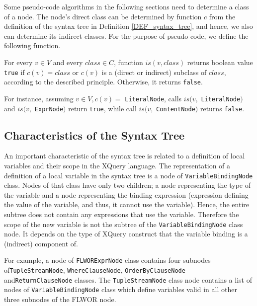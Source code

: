 Some pseudo-code algorithms in the following sections need to determine a class of a node. The node's direct class can be determined by function $c$ from the definition of the syntax tree in Definition \ref{DEF_syntax_tree}, and hence, we also can determine its indirect classes. For the purpose of pseudo code, we define the following function.

\begin{define}For every $v \in V$ and every $class \in C$, function $is(v, class)$ returns boolean value \texttt{true} if $c(v) = class$ or $c(v)$ is a (direct or indirect) subclass of $class$, according to the described principle. Otherwise, it returns \texttt{false}.
\end{define}

For instance, assuming $v \in V, c(v) =$ \texttt{LiteralNode}, calls $is(v,$ \texttt{LiteralNode}$)$ and $is(v,$ \texttt{ExprNode}$)$ return \texttt{true}, while call $is(v,$ \texttt{ContentNode}$)$ returns \texttt{false}.

\subsection{Characteristics of the Syntax Tree}
An important characteristic of the syntax tree is related to a definition of local variables and their scope in the XQuery language. The representation of a definition of a local variable in the syntax tree is a node of \texttt{VariableBindingNode} class. Nodes of that class have only two children; a node representing the type of the variable and a node representing the binding expression (expression defining the value of the variable, and thus, it cannot use the variable). Hence, the entire subtree does not contain any expressions that use the variable. Therefore the scope of the new variable is not the subtree of the \texttt{VariableBindingNode} class node. It depends on the type of XQuery construct that the variable binding is a (indirect) component of.

For example, a node of \texttt{FLWORExprNode} class contains four subnodes of\linebreak \texttt{TupleStreamNode}, \texttt{WhereClauseNode}, \texttt{OrderByClauseNode} and\linebreak \texttt{ReturnClauseNode} classes. The \texttt{TupleStreamNode} class node contains a list of nodes of \texttt{VariableBindingNode} class which define variables valid in all other three subnodes of the FLWOR node.

